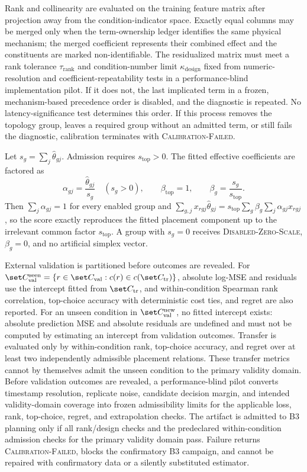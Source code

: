 Rank and collinearity are evaluated on the training feature matrix after projection away from the condition-indicator space. Exactly equal columns may be merged only when the term-ownership ledger identifies the same physical mechanism; the merged coefficient represents their combined effect and the constituents are marked non-identifiable. The residualized matrix must meet a rank tolerance $\tau_{\mathrm{rank}}$ and condition-number limit $\kappa_{\mathrm{design}}$ fixed from numeric-resolution and coefficient-repeatability tests in a performance-blind implementation pilot. If it does not, the last implicated term in a frozen, mechanism-based precedence order is disabled, and the diagnostic is repeated. No latency-significance test determines this order. If this process removes the topology group, leaves a required group without an admitted term, or still fails the diagnostic, calibration terminates with \textsc{Calibration-Failed}.

Let $s_g=\sum_j\widehat\theta_{gj}$. Admission requires $s_{\mathrm{top}}>0$. The fitted effective coefficients are factored as
\begin{equation}
 \alpha_{gj}=\frac{\widehat\theta_{gj}}{s_g}\quad(s_g>0),
 \qquad \beta_{\mathrm{top}}=1,
 \qquad \beta_g=\frac{s_g}{s_{\mathrm{top}}}.
 \label{eq:coefficient-factorization}
\end{equation}
Then $\sum_j\alpha_{gj}=1$ for every enabled group and
$\sum_{g,j}x_{rgj}\widehat\theta_{gj}=s_{\mathrm{top}}
\sum_g\beta_g\sum_j\alpha_{gj}x_{rgj}$, so the score exactly reproduces the fitted placement component up to the irrelevant common factor $s_{\mathrm{top}}$. A group with $s_g=0$ receives \textsc{Disabled-Zero-Scale}, $\beta_g=0$, and no artificial simplex vector.

External validation is partitioned before outcomes are revealed. For $\set C_{\mathrm{val}}^{\mathrm{seen}}=\{r\in\set C_{\mathrm{val}}:c(r)\in c(\set C_{\mathrm{tr}})\}$, absolute log-MSE and residuals use the intercept fitted from $\set C_{\mathrm{tr}}$, and within-condition Spearman rank correlation, top-choice accuracy with deterministic cost ties, and regret are also reported. For an unseen condition in $\set C_{\mathrm{val}}^{\mathrm{new}}$, no fitted intercept exists: absolute prediction MSE and absolute residuals are undefined and must not be computed by estimating an intercept from validation outcomes. Transfer is evaluated only by within-condition rank, top-choice accuracy, and regret over at least two independently admissible placement relations. These transfer metrics cannot by themselves admit the unseen condition to the primary validity domain. Before validation outcomes are revealed, a performance-blind pilot converts timestamp resolution, replicate noise, candidate decision margin, and intended validity-domain coverage into frozen admissibility limits for the applicable loss, rank, top-choice, regret, and extrapolation checks. The artifact is admitted to B3 planning only if all rank/design checks and the predeclared within-condition admission checks for the primary validity domain pass. Failure returns \textsc{Calibration-Failed}, blocks the confirmatory B3 campaign, and cannot be repaired with confirmatory data or a silently substituted estimator.

